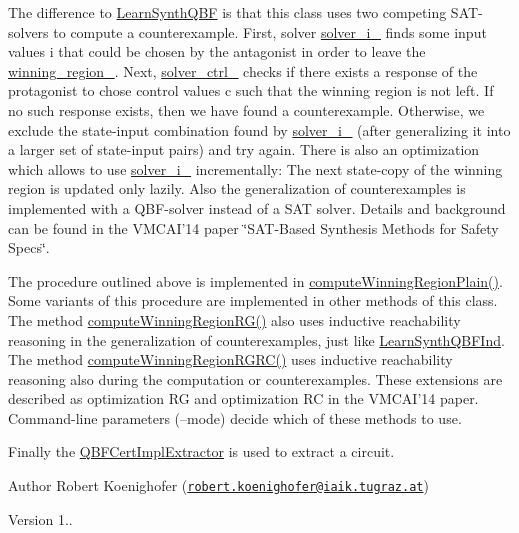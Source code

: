 The difference to \hyperlink{classLearnSynthQBF}{Learn\-Synth\-Q\-B\-F} is that this class uses two competing S\-A\-T-\/solvers to compute a counterexample. First, solver \hyperlink{classLearnSynthSAT_a97e5c03d47cb7f237104472972b12c1c}{solver\-\_\-i\-\_\-} finds some input values i that could be chosen by the antagonist in order to leave the \hyperlink{classLearnSynthSAT_aced2bce789c7a93ed4b5391dd0690616}{winning\-\_\-region\-\_\-}. Next, \hyperlink{classLearnSynthSAT_abb28d64291205442f1df055049ef0195}{solver\-\_\-ctrl\-\_\-} checks if there exists a response of the protagonist to chose control values c such that the winning region is not left. If no such response exists, then we have found a counterexample. Otherwise, we exclude the state-\/input combination found by \hyperlink{classLearnSynthSAT_a97e5c03d47cb7f237104472972b12c1c}{solver\-\_\-i\-\_\-} (after generalizing it into a larger set of state-\/input pairs) and try again. There is also an optimization which allows to use \hyperlink{classLearnSynthSAT_a97e5c03d47cb7f237104472972b12c1c}{solver\-\_\-i\-\_\-} incrementally\-: The next state-\/copy of the winning region is updated only lazily. Also the generalization of counterexamples is implemented with a Q\-B\-F-\/solver instead of a S\-A\-T solver. Details and background can be found in the V\-M\-C\-A\-I'14 paper \char`\"{}\-S\-A\-T-\/\-Based
\-Synthesis Methods for Safety Specs\char`\"{}.

The procedure outlined above is implemented in \hyperlink{classLearnSynthSAT_a49541a9cff8002ca31e0044ae35546a2}{compute\-Winning\-Region\-Plain()}. Some variants of this procedure are implemented in other methods of this class. The method \hyperlink{classLearnSynthSAT_aa981048565f10183c30c4dc0576de6b6}{compute\-Winning\-Region\-R\-G()} also uses inductive reachability reasoning in the generalization of counterexamples, just like \hyperlink{classLearnSynthQBFInd}{Learn\-Synth\-Q\-B\-F\-Ind}. The method \hyperlink{classLearnSynthSAT_a2d54b84ce5e87b7b2d398226faa501b0}{compute\-Winning\-Region\-R\-G\-R\-C()} uses inductive reachability reasoning also during the computation or counterexamples. These extensions are described as optimization R\-G and optimization R\-C in the V\-M\-C\-A\-I'14 paper. Command-\/line parameters (--mode) decide which of these methods to use.

Finally the \hyperlink{classQBFCertImplExtractor}{Q\-B\-F\-Cert\-Impl\-Extractor} is used to extract a circuit.

\begin{DoxyAuthor}{Author}
Robert Koenighofer (\href{mailto:robert.koenighofer@iaik.tugraz.at}{\tt robert.\-koenighofer@iaik.\-tugraz.\-at}) 
\end{DoxyAuthor}
\begin{DoxyVersion}{Version}
1.. 
\end{DoxyVersion}


